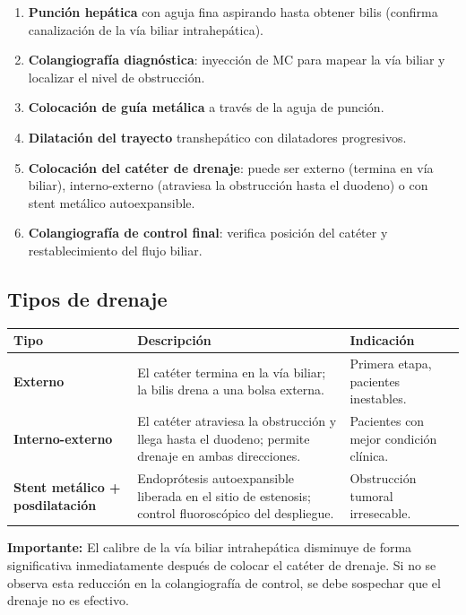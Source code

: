 \begin{enumerate}[noitemsep]
	\item \textbf{Punción hepática} con aguja fina aspirando hasta obtener bilis (confirma canalización de la vía biliar intrahepática).
	\item \textbf{Colangiografía diagnóstica}: inyección de MC para mapear la vía biliar y localizar el nivel de obstrucción.
	\item \textbf{Colocación de guía metálica} a través de la aguja de punción.
	\item \textbf{Dilatación del trayecto} transhepático con dilatadores progresivos.
	\item \textbf{Colocación del catéter de drenaje}: puede ser externo (termina en vía biliar), interno-externo (atraviesa la obstrucción hasta el duodeno) o con stent metálico autoexpansible.
	\item \textbf{Colangiografía de control final}: verifica posición del catéter y restablecimiento del flujo biliar.
\end{enumerate}

\subsection*{Tipos de drenaje}

{\renewcommand{\arraystretch}{1.3}
	\begin{center}
		\begin{tabular}{>{\bfseries}p{3.5cm} p{5cm} p{5cm}}
			\hline
			Tipo & Descripción & Indicación \\
			\hline
			Externo & El catéter termina en la vía biliar; la bilis drena a una bolsa externa. & Primera etapa, pacientes inestables. \\[0.5em]
			\hline
			Interno-externo & El catéter atraviesa la obstrucción y llega hasta el duodeno; permite drenaje en ambas direcciones. & Pacientes con mejor condición clínica. \\[0.5em]
			\hline
			Stent metálico + posdilatación & Endoprótesis autoexpansible liberada en el sitio de estenosis; control fluoroscópico del despliegue. & Obstrucción tumoral irresecable. \\
			\hline
		\end{tabular}
	\end{center}
}

\vspace{0.5em}

\begin{cajariesgo}
	\textbf{Importante:} El calibre de la vía biliar intrahepática disminuye de forma significativa inmediatamente después de colocar el catéter de drenaje. Si no se observa esta reducción en la colangiografía de control, se debe sospechar que el drenaje no es efectivo.
\end{cajariesgo}


